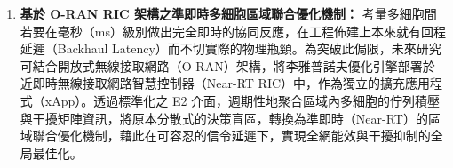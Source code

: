 \begin{enumerate}
    \item \textbf{基於 O-RAN RIC 架構之準即時多細胞區域聯合優化機制：}
    考量多細胞間若要在毫秒（ms）級別做出完全即時的協同反應，在工程佈建上本來就有回程延遲（Backhaul Latency）而不切實際的物理瓶頸。為突破此侷限，未來研究可結合開放式無線接取網路（O-RAN）架構，將李雅普諾夫優化引擎部署於近即時無線接取網路智慧控制器（Near-RT RIC）中，作為獨立的擴充應用程式（xApp）。透過標準化之 E2 介面，週期性地聚合區域內多細胞的佇列積壓與干擾矩陣資訊，將原本分散式的決策盲區，轉換為準即時（Near-RT）的區域聯合優化機制，藉此在可容忍的信令延遲下，實現全網能效與干擾抑制的全局最佳化。
\end{enumerate}